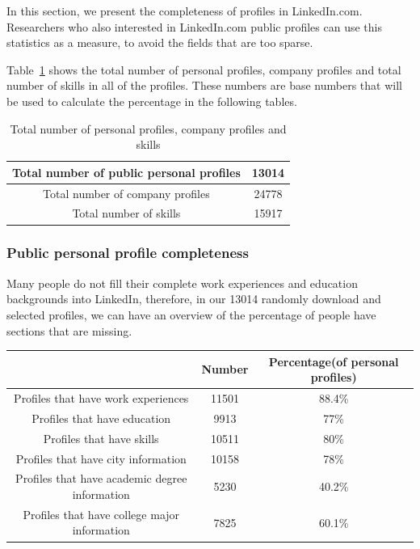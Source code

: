 In this section, we present the completeness of profiles in LinkedIn.com. Researchers who also interested in LinkedIn.com public profiles can use this statistics as a measure, to avoid the fields that are too sparse.

Table~\ref{tab:NumCount} shows the total number of personal profiles, company profiles and total number of skills in all of the profiles. These numbers are base numbers that will be used to calculate the percentage in the following tables.

\begin{table}[H]
    \begin{tabular}{|c|c|}
    \hline
    Total number of public personal profiles & 13014 \\ \hline
    Total number of company profiles         & 24778 \\ \hline
    Total number of skills                   & 15917 \\ \hline
    \end{tabular}
    \caption{Total number of personal profiles, company profiles and skills}
  	\label{tab:NumCount}
\end{table}

\subsubsection{Public personal profile completeness}

Many people do not fill their complete work experiences and education backgrounds into LinkedIn, therefore, in our 13014 randomly download and selected profiles, we can have an overview of the percentage of people have sections that are missing.

\begin{table}[H]
    \begin{tabular}{|c|c|c|}
    \hline
    ~                                                             & Number & Percentage(of personal profiles) \\ \hline
    Profiles that have work experiences                           & 11501  & 88.4\%                             \\ \hline
    Profiles that have education                                  & 9913   & 77\%                               \\ \hline
    Profiles that have skills                                     & 10511  & 80\%                               \\ \hline
    Profiles that have city information & 10158  & 78\%                               \\ \hline
    Profiles that have academic degree information                & 5230   & 40.2\%                             \\ \hline
    Profiles that have college major information                  & 7825   & 60.1\%                             \\ \hline
    \end{tabular}
\end{table}

